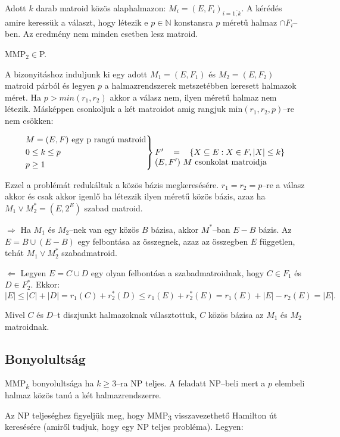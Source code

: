 Adott $k$ darab matroid közös alaphalmazon: $M_i=(E,F_i)_{i=\overline{1,k}}$. A
kérédés amire keressük a választ, hogy létezik e $p \in \mathbb{N}$ konstansra
$p$ méretű halmaz $\cap F_i$--ben. Az eredmény nem minden esetben lesz matroid.

\vspace{0.4cm}
MMP$_2 \in $P.
\vspace{0.4cm}

A bizonyitáshoz induljunk ki egy adott $M_1=(E,F_1)$ és $M_2=(E,F_2)$ matroid
párból és legyen $p$ a halmazrendszerek metszetébben keresett halmazok méret.
Ha $p>min(r_1, r_2)$ akkor a válasz nem, ilyen méretű halmaz nem létezik.
Másképpen csonkoljuk a két matroidot amig rangjuk min$(r_1,r_2, p)$--re nem
csökken:

\[ \begin{rcases}
M=(E,F) \mbox{ egy p rangú matroid} \\
0 \leq k \leq p \\ 
p \geq 1 
\end{rcases} \parbox[t]{5.5cm}
{$F' = \left\{ X \subseteq E: X \in F, |X| \leq k \right\}$ 
$(E,F')~M$ csonkolat matroidja} \]

Ezzel a problémát redukáltuk a közös bázis megkeresésére. $r_1=r_2=p$--re a
válasz akkor és csak akkor igenlő ha létezzik ilyen méretű közös bázis, azaz ha
$M_1 \vee M_2^*=(E,2^E)$ szabad matroid.

$\Rightarrow$ Ha $M_1$ és $M_2$--nek van egy közös $B$ bázisa, akkor $M^*$--ban
$E-B$ bázis. Az $E=B \cup (E-B)$ egy felbontása az összegnek, azaz az összegben
$E$ független, tehát $M_1 \vee M_2^*$ szabadmatroid.

$\Leftarrow$ Legyen $E=C \cup D$ egy olyan felbontása a szabadmatroidnak, hogy
$C \in F_1$ és $D \in F_2^*$. Ekkor:
\[|E| \leq |C| + |D| = r_1(C) + r_2^*(D) \leq r_1(E)+r_2^*(E) = r_1(E) + |E| - r_2(E)=|E|. \]

Mivel $C$ és $D$--t diszjunkt halmazoknak választottuk, $C$ közös bázisa az $M_1$ és
$M_2$ matroidnak.

\subsection{Bonyolultság}

MMP\textsubscript{$k$} bonyolultsága ha $k \geq 3$--ra NP teljes. A feladatt
NP--beli mert a $p$ elembeli halmaz közös tanú a két halmazrendszerre.

Az NP teljeséghez figyeljük meg, hogy MMP\textsubscript{$3$} visszavezethető
Hamilton út keresésére (amiről tudjuk, hogy egy NP teljes probléma). Legyen:


